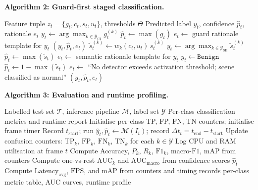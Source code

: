 \documentclass[sensors,article,submit,pdftex,moreauthors]{Definitions/mdpi}
\begin{document}
\noindent\textbf{Algorithm 2: Guard-first staged classification.}
\begin{algorithm}[H]
\caption{Guard-First Stacked Classification}
\label{alg:stacked}
\begin{algorithmic}[1]
\Require Feature tuple $z_t = \{g_t, c_t, s_t, u_t\}$, thresholds $\Theta$
\Ensure Predicted label $y_t$, confidence $\hat{p}_t$, rationale $e_t$
    \State $y_t \leftarrow \arg\max_{k \in \mathcal{Y}_{\text{CI}}} g_t^{(k)}$
    \State $\hat{p}_t \leftarrow \max(g_t)$
    \State $e_t \leftarrow$ guard rationale template for $y_t$
    \State \Return $(y_t, \hat{p}_t, e_t)$
\EndIf
{}
    \State $\tilde{s}_t^{(k)} \leftarrow w_k(c_t, u_t)\, s_t^{(k)}$ 
\EndFor
{}
    \State $y_t \leftarrow \arg\max_{k \in \mathcal{Y}_{\text{SE}}} \tilde{s}_t^{(k)}$
    \State $\hat{p}_t \leftarrow \max(\tilde{s}_t)$
    \State $e_t \leftarrow$ semantic rationale template for $y_t$
\Else
    \State $y_t \leftarrow \texttt{Benign}$
    \State $\hat{p}_t \leftarrow 1 - \max(\tilde{s}_t)$
    \State $e_t \leftarrow$ ``No detector exceeds activation threshold; scene classified as normal''
\EndIf
\State \Return $(y_t, \hat{p}_t, e_t)$
\end{algorithmic}
\end{algorithm}
 
\noindent\textbf{Algorithm 3: Evaluation and runtime profiling.}
\begin{algorithm}[H]
\caption{Evaluation and Runtime Metrics Pipeline}
\label{alg:evaluate}
\begin{algorithmic}[1]
\Require Labelled test set $\mathcal{T}$, inference pipeline $\mathcal{M}$, label set $\mathcal{Y}$
\Ensure Per-class classification metrics and runtime report
\State Initialise per-class TP, FP, FN, TN counters; initialise frame timer
    \State Record $t_{\text{start}}$; run $\hat{y}_t, \hat{p}_t \leftarrow \mathcal{M}(I_t)$; record $\Delta t_t = t_{\text{end}} - t_{\text{start}}$
    \State Update confusion counters: $\mathrm{TP}_k$, $\mathrm{FP}_k$, $\mathrm{FN}_k$, $\mathrm{TN}_k$ for each $k \in \mathcal{Y}$
    \State Log CPU and RAM utilisation at frame $t$
\EndFor
\State Compute Accuracy, $P_k$, $R_k$, $\mathrm{F1}_k$, macro-$\mathrm{F1}$, mAP from counters
\State Compute one-vs-rest $\mathrm{AUC}_k$ and $\mathrm{AUC}_{\text{macro}}$ from confidence scores $\hat{p}_t$
\State Compute $\mathrm{Latency}_{\text{avg}}$, $\mathrm{FPS}$, and mAP from counters and timing records
\State \Return per-class metric table, AUC curves, runtime profile
\end{algorithmic}
\end{algorithm}
 
\end{document}
